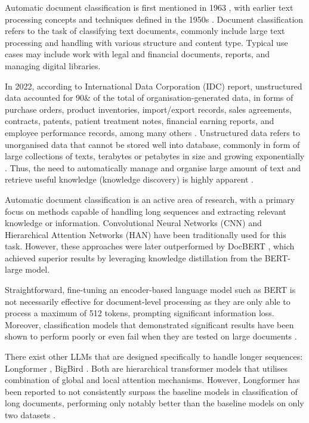 Automatic document classification is first mentioned in 1963 \cite{borko-1963-auto-doc-classification}, with earlier text processing concepts and techniques defined in the 1950s \cite{luhn-1958-business-intelligence-system}. Document classification refers to the task of classifying text documents, commonly include large text processing and handling with various structure and content type. Typical use cases may include work with legal and financial documents, reports, and managing digital libraries.

In 2022, according to International Data Corporation (IDC) report, unstructured data accounted for 90\& of the total of organisation-generated data, in forms of purchase orders, product inventories, import/export records, sales agreements, contracts, patents, patient treatment notes, financial earning reports, and employee performance records, among many others \cite{box-2023-untapped}. Unstructured data refers to unorganised data that cannot be stored well into database, commonly in form of large collections of texts, terabytes or petabytes in size and growing exponentially \cite{mishra-2017-structured-unstructured}. Thus, the need to automatically manage and organise large amount of text and retrieve useful knowledge (knowledge discovery) is highly apparent \cite{mali-2021-relevance-of-preprocessing}.

Automatic document classification is an active area of research, with a primary focus on methods capable of handling long sequences and extracting relevant knowledge or information. Convolutional Neural Networks (CNN) \cite{afzal-deepdocclassifier,liu-2017-xmlcnn} and Hierarchical Attention Networks (HAN) \cite{yang-2016-han} have been traditionally used for this task. However, these approaches were later outperformed by DocBERT \cite{adhikari-2019-docbert}, which achieved superior results by leveraging knowledge distillation from the BERT-large model.

Straightforward, fine-tuning an encoder-based language model such as BERT is not necessarily effective for document-level processing as they are only able to process a maximum of 512 tokens, prompting significant information loss. Moreover, classification models that demonstrated significant results have been shown to perform poorly or even fail when they are tested on large documents \cite{wan-2019-long-length}.

There exist other LLMs that are designed specifically to handle longer sequences: Longformer \cite{beltagy-2020-longformer}, BigBird \cite{zaheer-2021-bigbird}. Both are hierarchical transformer models that utilises combination of global and local attention mechanisms. However, Longformer has been reported to not consistently surpass the baseline models in classification of long documents, performing only notably better than the baseline models on only two datasets \cite{park-2022-efficient}.

